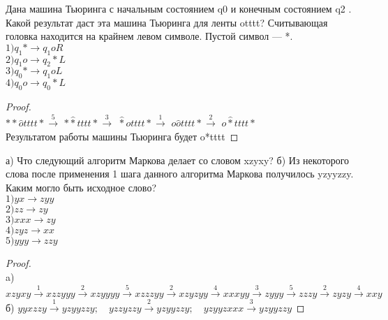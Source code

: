 \begin{problem}
Дана машина Тьюринга с начальным состоянием q0 и
конечным состоянием q2 . Какой результат даст эта машина Тьюринга для ленты otttt? Считывающая головка находится на крайнем левом символе. Пустой символ — *.\\
$1) q_1* \to q_1oR$\\
$2) q_1o \to q_2 * L$\\
$3) q_0* \to q_1oL$\\
$4) q_0o \to q_0*L$
\end{problem}
\begin{proof} $ $\\
$**\hat{o}tttt* \xrightarrow{5}$
$*\hat{*}tttt* \xrightarrow{3}$
$\hat{*}otttt* \xrightarrow{1}$
$o\hat{o}tttt* \xrightarrow{2}$
$o\hat{*}tttt*$\\
Результатом работы машины Тьюринга будет o*tttt
\end{proof}


\begin{problem}
а) Что следующий алгоритм Маркова делает со словом
xzyxy?
б) Из некоторого слова после применения 1 шага данного алгоритма Маркова получилось yzyyzzy. Каким могло быть исходное слово?\\
$1) yx \to zyy$\\
$2) zz \to zy$\\
$3) xxx \to zy$\\
$4) zyz \to xx$\\
$5) yyy \to zzy$
\end{problem}
\begin{proof} $ $\\
a) $xzyxy \xrightarrow{1} xzzyyy \xrightarrow{2} xzyyyy \xrightarrow{5} xzzzyy \xrightarrow{2} xzyzyy \xrightarrow{4} xxxyy \xrightarrow{3} zyyy \xrightarrow{5} zzzy \xrightarrow{2} zyzy \xrightarrow{4} xxy$\\
б) $yyxzzy \xrightarrow{1} yzyyzzy; \quad yzzyzzy \xrightarrow{2} yzyyzzy; \quad yzyyzxxx \xrightarrow{3} yzyyzzy$
\end{proof}

